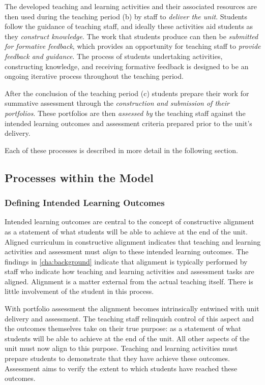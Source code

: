 The developed teaching and learning activities and their associated resources are then used during the teaching period (b) by staff to \emph{deliver the unit}. Students follow the guidance of teaching staff, and ideally these activities aid students as they \emph{construct knowledge}. The work that students produce can then be \emph{submitted for formative feedback}, which provides an opportunity for teaching staff to \emph{provide feedback and guidance}. The process of students undertaking activities, constructing knowledge, and receiving formative feedback is designed to be an ongoing iterative process throughout the teaching period.

After the conclusion of the teaching period (c) students prepare their work for summative assessment through the \emph{construction and submission of their portfolios}. These portfolios are then \emph{assessed by} the teaching staff against the intended learning outcomes and assessment criteria prepared prior to the unit's delivery.

Each of these processes is described in more detail in the following section.


\subsection{Processes within the Model} %
\label{sub:processes_within_the_model}

\subsubsection{Defining Intended Learning Outcomes} %
\label{sub:defining_intended_learning_outcomes}

Intended learning outcomes are central to the concept of constructive alignment as a statement of what students will be able to achieve at the end of the unit. Aligned curriculum in constructive alignment indicates that teaching and learning activities and assessment must \emph{align} to these intended learning outcomes. The findings in \cref{cha:background} indicate that alignment is typically performed by staff who indicate how teaching and learning activities and assessment tasks are aligned. Alignment is a matter external from the actual teaching itself. There is little involvement of the student in this process.

With portfolio assessment the alignment becomes intrinsically entwined with unit delivery and assessment. The teaching staff relinquish control of this aspect and the outcomes themselves take on their true purpose: as a statement of what students will be able to achieve at the end of the unit. All other aspects of the unit must now align to this purpose. Teaching and learning activities must prepare students to demonstrate that they have achieve these outcomes. Assessment aims to verify the extent to which students have reached these outcomes.

